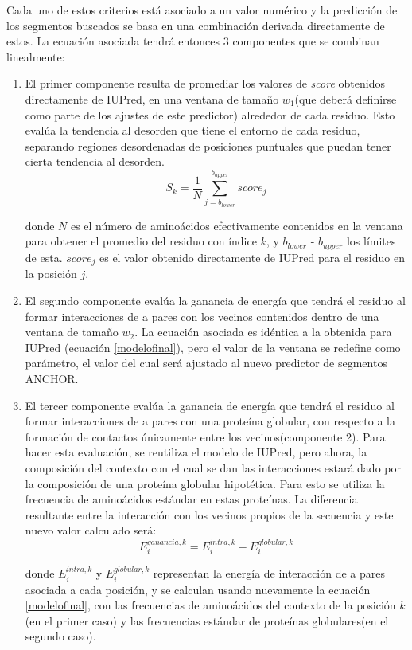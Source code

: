 Cada uno de estos criterios está asociado a un valor numérico y la predicción de los segmentos buscados se basa en una combinación derivada directamente de estos.
La ecuación asociada tendrá entonces 3 componentes que se combinan linealmente:
\begin{enumerate}
 \item El primer componente resulta de promediar los valores de \textit{score} obtenidos directamente de IUPred, en una ventana de tamaño $w_1$(que deberá definirse como parte de los ajustes de este predictor) alrededor de cada residuo. 
Esto evalúa la tendencia al desorden que tiene el entorno de cada residuo, separando regiones desordenadas de posiciones puntuales que puedan tener cierta tendencia al desorden.
\begin{equation}\label{score1}
 S_k = \frac{1}{N} \sum_{j=b_{lower}}^{b_{upper}} score_j
\end{equation}

donde $N$ es el número de aminoácidos efectivamente contenidos en la ventana para obtener el promedio del residuo con índice $k$, y $b_{lower}$ - $b_{upper}$ los límites de esta.
$score_j$ es el valor obtenido directamente de IUPred para el residuo en la posición $j$.

\item El segundo componente evalúa la ganancia de energía que tendrá el residuo al formar interacciones de a pares con los vecinos contenidos dentro de una ventana de tamaño $w_2$. 
La ecuación asociada es idéntica a la obtenida para IUPred (ecuación \ref{modelofinal}), pero el valor de la ventana se redefine como parámetro, el valor del cual será ajustado 
al nuevo predictor de segmentos ANCHOR.

\item El tercer componente evalúa la ganancia de energía que tendrá el residuo al formar interacciones de a pares con una proteína globular, 
con respecto a la formación de contactos únicamente entre los vecinos(componente 2). Para hacer esta evaluación, se reutiliza el modelo de IUPred, pero ahora, 
la composición del contexto con el cual se dan las interacciones estará dado por la composición de una proteína globular hipotética. 
Para esto se utiliza la frecuencia de aminoácidos estándar en estas proteínas.
La diferencia resultante entre la interacción con los vecinos propios de la secuencia y este nuevo valor calculado será:
\begin{equation}\label{score3}
E_i^{ganancia,k} = E_i^{intra,k} - E_i^{globular,k}
\end{equation}

donde $E_i^{intra,k}$ y $E_i^{globular,k}$ representan la energía de interacción de a pares asociada a cada posición, y se calculan usando nuevamente la ecuación \ref{modelofinal}, 
con las frecuencias de aminoácidos del contexto de la posición $k$(en el primer caso) y las frecuencias estándar de proteínas globulares(en el segundo caso).
\end{enumerate}

